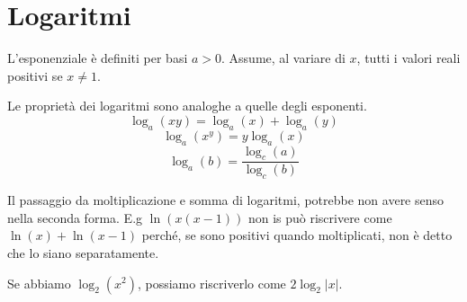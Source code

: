 \documentclass[a4paper]{article}
\begin{document}

\section{Logaritmi}

L'esponenziale è definiti per basi \(a > 0\).
Assume, al variare di \(x\), tutti i valori reali positivi se \(x \neq 1\).


Le proprietà dei logaritmi sono analoghe a quelle degli esponenti.
 {
    \[
        \log_a(xy) = \log_a(x) + \log_a(y)
    \]
    \[
        \log_a(x^y) = y\log_a(x)
    \]
    \[
        \log_a(b) = \frac{\log_c(a)}{\log_c(b)}
    \]
}



Il passaggio da moltiplicazione e somma di logaritmi, potrebbe non avere senso
nella seconda forma.
E.g \(\ln(x(x-1))\) non is può riscrivere come \(\ln(x) + \ln(x-1)\)
perché, se sono positivi quando moltiplicati, non è detto che lo siano separatamente.

Se abbiamo \(\log_2(x^2)\), possiamo riscriverlo come \(2 \log_2|x|\).


\end{document}
